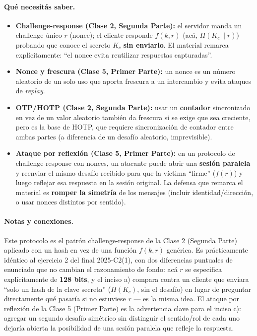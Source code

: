 \paragraph{Qué necesitás saber.}
\begin{itemize}
  \item \textbf{Challenge-response (Clase 2, Segunda Parte):} el servidor manda un
  challenge único $r$ (nonce); el cliente responde $f(k,r)$ (acá, $H(K_c\|r)$)
  probando que conoce el secreto $K_c$ \textbf{sin enviarlo}. El material remarca
  explícitamente: ``el nonce evita reutilizar respuestas capturadas''.
  \item \textbf{Nonce y frescura (Clase 5, Primer Parte):} un nonce es un número
  aleatorio de un solo uso que aporta frescura a un intercambio y evita ataques de
  \emph{replay}.
  \item \textbf{OTP/HOTP (Clase 2, Segunda Parte):} usar un \textbf{contador}
  sincronizado en vez de un valor aleatorio también da frescura si se exige que sea
  creciente, pero es la base de HOTP, que requiere sincronización de contador entre
  ambas partes (a diferencia de un desafío aleatorio, imprevisible).
  \item \textbf{Ataque por reflexión (Clase 5, Primer Parte):} en un protocolo de
  challenge-response con nonces, un atacante puede abrir una \textbf{sesión
  paralela} y reenviar el mismo desafío recibido para que la víctima ``firme''
  ($f(r)$) y luego reflejar esa respuesta en la sesión original. La defensa que
  remarca el material es \textbf{romper la simetría} de los mensajes (incluir
  identidad/dirección, o usar nonces distintos por sentido).
\end{itemize}

\paragraph{Notas y conexiones.}
Este protocolo es el patrón challenge-response de la Clase 2 (Segunda Parte)
aplicado con un hash en vez de una función $f(k,r)$ genérica. Es prácticamente
idéntico al ejercicio 2 del final 2025-C2(1), con dos diferencias puntuales de
enunciado que no cambian el razonamiento de fondo: acá $r$ se especifica
explícitamente de \textbf{128 bits}, y el inciso a) compara contra un cliente que
enviara ``solo un hash de la clave secreta'' ($H(K_c)$, sin el desafío) en lugar de
preguntar directamente qué pasaría si no estuviese $r$ --- es la misma idea. El
ataque por reflexión de la Clase 5 (Primer Parte) es la advertencia clave para el
inciso c): agregar un segundo desafío simétrico sin distinguir el sentido/rol de
cada uno dejaría abierta la posibilidad de una sesión paralela que refleje la
respuesta.


